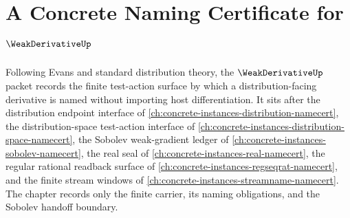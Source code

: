 \chapter{A Concrete Naming Certificate for $\WeakDerivativeUp$}
\label{ch:concrete-instances-weak-derivative-namecert}

Following Evans and standard distribution theory, the $\WeakDerivativeUp$ packet records the finite test-action surface by which a distribution-facing derivative is named without importing host differentiation. It sits after the distribution endpoint interface of \autoref{ch:concrete-instances-distribution-namecert}, the distribution-space test-action interface of \autoref{ch:concrete-instances-distribution-space-namecert}, the Sobolev weak-gradient ledger of \autoref{ch:concrete-instances-sobolev-namecert}, the real seal of \autoref{ch:concrete-instances-real-namecert}, the regular rational readback surface of \autoref{ch:concrete-instances-regseqrat-namecert}, and the finite stream windows of \autoref{ch:concrete-instances-streamname-namecert}. The chapter records only the finite carrier, its naming obligations, and the Sobolev handoff boundary.

